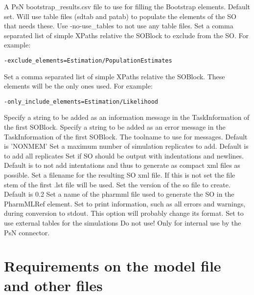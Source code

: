 \begin{optionlist}
A PsN bootstrap\_results.csv file to use for filling the Bootstrap elements.
\nextopt
{}
Default set. Will use table files (sdtab and patab) to populate the elements of the SO that needs these. Use -no-use\_tables to not use any table files.
\nextopt
{}
Set a comma separated list of simple XPaths relative the SOBlock to exclude from the SO.
For example:
\begin{verbatim}
-exclude_elements=Estimation/PopulationEstimates
\end{verbatim}
\nextopt
{}
Set a comma separated list of simple XPaths relative the SOBlock. These elements will be the only ones used.
For example: 
\begin{verbatim}
-only_include_elements=Estimation/Likelihood
\end{verbatim}
\nextopt
{}
Specify a string to be added as an information message in the TaskInformation of the first SOBlock.
\nextopt
{}
Specify a string to be added as an error message in the TaskInformation of the first SOBlock.
\nextopt
{}
The toolname to use for messages. Default is 'NONMEM'
\nextopt
{}
Set a maximum number of simulation replicates to add. Default is to add all replicates
\nextopt
{}
Set if SO should be output with indentations and newlines.
Default is to not add intentations and thus to generate as compact xml files as possible.
\nextopt
{}
Set a filename for the resulting SO xml file. If this is not set the file stem of the first .lst file will be used.
\nextopt
{}
Set the version of the so file to create. Default is 0.2
\nextopt
{}
Set a name of the pharmml file used to generate the SO
in the PharmMLRef element.
\nextopt
{}
Set to print information, such as all errors and warnings, during conversion to stdout.
\nextopt
{}
This option will probably change its format.
Set to use external tables for the simulations
\nextopt
{}
Do not use! Only for internal use by the PsN connector.
\nextopt
\end{optionlist}

\section{Requirements on the model file and other files}

